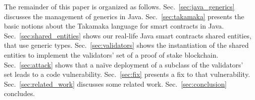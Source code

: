 The remainder of this paper is organized as follows.
Sec.~\ref{sec:java_generics} discusses the management of generics in Java.
Sec.~\ref{sec:takamaka} presents the basic notions about the Takamaka language for smart contracts in Java.
Sec.~\ref{sec:shared_entities} shows our real-life Java smart
contracts shared entities, that use generic types.
Sec.~\ref{sec:validators} shows the instantiation of the shared entities to implement the validators' set
of a proof of stake blockchain.
Sec.~\ref{sec:attack} shows that a na\"{i}ve
deployment of a subclass of the validators' set leads to a code vulnerability.
Sec.~\ref{sec:fix} presents a fix to that vulnerability.
Sec.~\ref{sec:related_work} discusses some related work.
Sec.~\ref{sec:conclusion} concludes.

